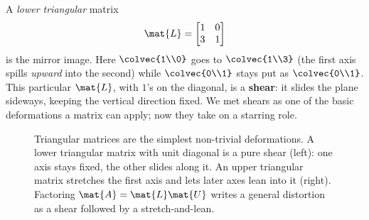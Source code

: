A \emph{lower triangular} matrix
\[
  \mat{L} = \begin{bmatrix} 1 & 0 \\ 3 & 1 \end{bmatrix}
\]
is the mirror image. Here $\colvec{1\\0}$ goes to $\colvec{1\\3}$ (the first axis spills
\emph{upward} into the second) while $\colvec{0\\1}$ stays put as $\colvec{0\\1}$. This
particular $\mat{L}$, with $1$'s on the diagonal, is a \textbf{shear}: it slides the plane
sideways, keeping the vertical direction fixed. We met shears as one of the basic
deformations a matrix can apply; now they take on a starring role.

\begin{figure}[H]
\centering
{}
\caption{Triangular matrices are the simplest non-trivial deformations. A lower triangular
matrix with unit diagonal is a pure shear (left): one axis stays fixed, the other slides
along it. An upper triangular matrix stretches the first axis and lets later axes lean into
it (right). Factoring $\mat{A}=\mat{L}\mat{U}$ writes a general distortion as a shear
followed by a stretch-and-lean.}
\label{ch09:fig-triangular}
\end{figure}

